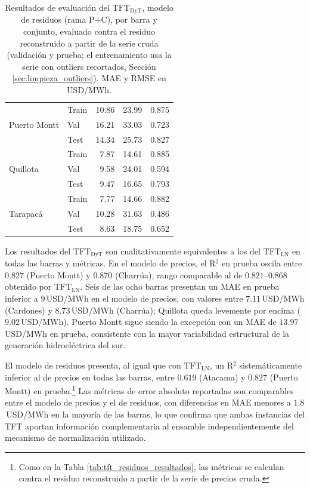 \begin{table}[htbp]
\begin{tabular}{llrrr}
        \midrule
        \multirow{3}{*}{Puerto Montt}
            & Train & 10.86 & 23.99 & 0.875 \\
            & Val   & 16.21 & 33.03 & 0.723 \\
            & Test  & 14.34 & 25.73 & 0.827 \\
        \midrule
        \multirow{3}{*}{Quillota}
            & Train & 7.87 & 14.61 & 0.885 \\
            & Val   & 9.58 & 24.01 & 0.594 \\
            & Test  & 9.47 & 16.65 & 0.793 \\
        \midrule
        \multirow{3}{*}{Tarapacá}
            & Train & 7.77 & 14.66 & 0.882 \\
            & Val   & 10.28 & 31.63 & 0.486 \\
            & Test  & 8.63 & 18.75 & 0.652 \\
        \bottomrule
    \end{tabular}
    \vspace{0.2cm}
    \caption{Resultados de evaluación del $\text{TFT}_\text{DyT}$, modelo de residuos (rama P+C), por barra y conjunto, evaluado contra el residuo reconstruido a partir de la serie cruda (validación y prueba; el entrenamiento usa la serie con outliers recortados, Sección \ref{sec:limpieza_outliers}). MAE y RMSE en USD/MWh.}
    \label{tab:tft_dyt_residuos_resultados}
\end{table}

Los resultados del $\text{TFT}_\text{DyT}$ son cualitativamente equivalentes a los del $\text{TFT}_\text{LN}$ en todas las barras y métricas. En el modelo de precios, el R$^2$ en prueba oscila entre $0.827$ (Puerto Montt) y $0.870$ (Charrúa), rango comparable al de $0.821$--$0.868$ obtenido por $\text{TFT}_\text{LN}$. Seis de las ocho barras presentan un MAE en prueba inferior a $9$\,USD/MWh en el modelo de precios, con valores entre $7.11$\,USD/MWh (Cardones) y $8.73$\,USD/MWh (Charrúa); Quillota queda levemente por encima ($9.02$\,USD/MWh). Puerto Montt sigue siendo la excepción con un MAE de $13.97$\,USD/MWh en prueba, consistente con la mayor variabilidad estructural de la generación hidroeléctrica del sur.

El modelo de residuos presenta, al igual que con $\text{TFT}_\text{LN}$, un R$^2$ sistemáticamente inferior al de precios en todas las barras, entre $0.619$ (Atacama) y $0.827$ (Puerto Montt) en prueba.\footnote{Como en la Tabla \ref{tab:tft_residuos_resultados}, las métricas se calculan contra el residuo reconstruido a partir de la serie de precios cruda.} Las métricas de error absoluto reportadas son comparables entre el modelo de precios y el de residuos, con diferencias en MAE menores a $1.8$\,USD/MWh en la mayoría de las barras, lo que confirma que ambas instancias del TFT aportan información complementaria al ensamble independientemente del mecanismo de normalización utilizado.

